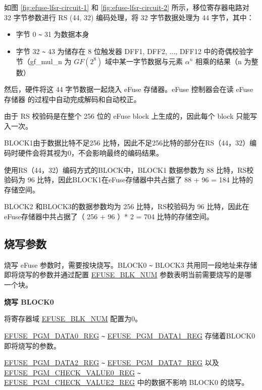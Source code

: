 \documentclass[main\_\_CN.tex]{subfiles}
\begin{document}
如图 \ref{fig:efuse-lfsr-circuit-1} 和 \ref{fig:efuse-lfsr-circuit-2} 所示，移位寄存器电路对 32 字节参数进行 RS (44, 32) 编码处理，将 32 字节数据处理为 44 字节，其中：

\begin{itemize}
    \item 字节 0 \verb+~+ 31 为数据本身
    \item 字节 32 \verb+~+ 43 为储存在 8 位触发器 DFF1, DFF2, ..., DFF12 中的奇偶校验字节（gf\_mul\_n 为 \(GF(2^8)\) 域中某一字节数据与元素 \(\alpha^n\) 相乘的结果（n 为整数）
\end{itemize}

然后，硬件将这 44 字节数据一起烧入 eFuse 存储器。eFuse 控制器会在读 eFuse 存储器 的过程中自动完成解码和自动校正。

由于 RS 校验码是在整个 256 位的 eFuse block 上生成的，因此每个 block 只能写入一次。

BLOCK1由于数据比特不足256 比特，因此不足256比特的部分在RS（44，32）编码时硬件会将其视为0，不会影响最终的编码结果。

使用RS（44，32）编码方式的BLOCK中，BLOCK1 数据参数为 88 比特，RS校验码为 96 比特，因此BLOCK1在eFuse存储器中共占据了 88 + 96 = 184 比特的存储空间。

BLOCK2 和BLOCK3的数据参数均为 256 比特，RS校验码为 96 比特，因此在eFuse存储器中共占据了（ 256 + 96 ）* 2 = 704 比特的存储空间。





\subsection{烧写参数}
\label{sec:efuse-software-programming-para}


烧写 eFuse 参数时，需要按块烧写。BLOCK0 \verb+~+ BLOCK3 共用同一段地址来存储即将烧写的参数并通过配置 \hyperref[fielddesc:EFUSEBLKNUM]{EFUSE\_BLK\_NUM} 参数表明当前需要烧写的是哪一个块。

{\bfseries 烧写 BLOCK0}

将寄存器域 \hyperref[fielddesc:EFUSEBLKNUM]{EFUSE\_BLK\_NUM} 配置为0。

\hyperref[regdesc:EFUSEPGMDATA0REG]{EFUSE\_PGM\_DATA0\_REG} \verb+~+ \hyperref[regdesc:EFUSEPGMDATA1REG]{EFUSE\_PGM\_DATA1\_REG} 存储着BLOCK0即将烧写的参数。

\hyperref[regdesc:EFUSEPGMDATA6REG]{EFUSE\_PGM\_DATA2\_REG} \verb+~+ \hyperref[regdesc:EFUSEPGMDATA7REG]{EFUSE\_PGM\_DATA7\_REG} 以及\\ \hyperref[regdesc:EFUSEPGMCHECKVALUE0REG]{EFUSE\_PGM\_CHECK\_VALUE0\_REG} \verb+~+ \hyperref[regdesc:EFUSEPGMCHECKVALUE2REG]{EFUSE\_PGM\_CHECK\_VALUE2\_REG} 中的数据不影响 BLOCK0 的烧写。
\end{document}
